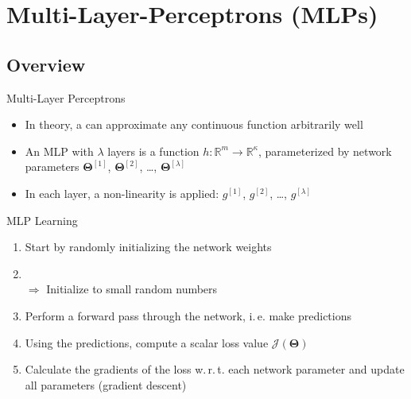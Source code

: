\section{Multi-Layer-Perceptrons (MLPs)}


\subsection{Overview}

\begin{frame}{Multi-Layer Perceptrons}{}
	\begin{itemize}
		\item In theory, a  can approximate any continuous function arbitrarily well
		\item An MLP with $\lambda$ layers is a function $h: \mathbb{R}^m \rightarrow \mathbb{R}^{\kappa}$,
			parameterized by network parameters $\bm{\Theta}^{[1]}$, $\bm{\Theta}^{[2]}$, \dots, $\bm{\Theta}^{[\lambda]}$
		\item In each layer, a non-linearity is applied: $g^{[1]}$, $g^{[2]}$, \dots, $g^{[\lambda]}$
	\end{itemize}
\end{frame}


\begin{frame}{MLP Learning}{}
	\begin{enumerate}
		\item Start by randomly initializing the network weights
		\item {} \\
			$\Rightarrow$ Initialize to small random numbers
		\item Perform a forward pass through the network, i.\,e. make predictions
		\item Using the predictions, compute a scalar loss value $\mathcal{J}(\bm{\Theta})$
		\item Calculate the gradients of the loss w.\,r.\,t. each network parameter and update all parameters (gradient descent)
	\end{enumerate}
\end{frame}


